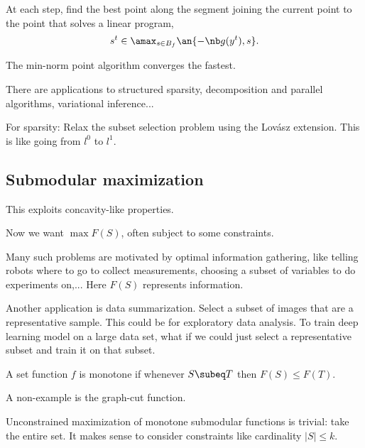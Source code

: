 At each step, find the best point along the segment joining the current point to the point that solves a linear program, %
$$
s^t\in \amax_{s\in B_f}\an{-\nb g(y^t), s}.
$$

The min-norm point algorithm converges the fastest.

There are applications to structured sparsity, decomposition and parallel algorithms, variational inference...

For sparsity: Relax the subset selection problem using the Lov\'asz extension. This is like going from $l^0$ to $l^1$. 


\subsection{Submodular maximization}



This exploits concavity-like properties.

Now we want $\max F(S)$, often subject to some constraints.

Many such problems are motivated by optimal information gathering, like telling robots where to go to collect measurements, choosing a subset of variables to do experiments on,... Here $F(S)$ represents information.

Another application is data summarization. Select a subset of images that are a representative sample. This could be for exploratory data analysis. To train deep learning model on a large data set, what if we could just select a representative subset and train it on that subset.

\begin{df}
A set function $f$ is monotone 
if whenever $S\subeq T$ then $F(S)\le F(T)$.
\end{df}
A non-example is the graph-cut function.

Unconstrained maximization of monotone submodular functions is trivial: take the entire set. It makes sense to consider constraints like cardinality $|S|\le k$.

